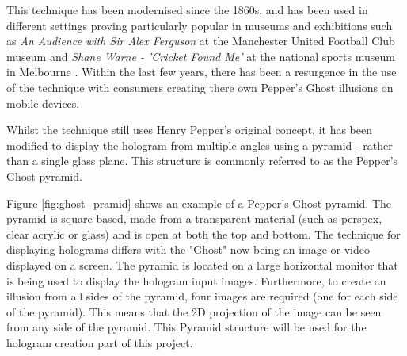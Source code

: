 This technique has been modernised since the 1860s, and has been used in different settings proving particularly popular in museums and exhibitions such as \textit{An Audience with Sir Alex Ferguson} at the Manchester United Football Club museum \cite{alex_ferguson} and \textit{Shane Warne - 'Cricket Found Me'} at the national sports museum in Melbourne \cite{shane_warne}. Within the last few years, there has been a resurgence in the use of the technique with consumers creating there own Pepper's Ghost illusions on mobile devices.

Whilst the technique still uses Henry Pepper's original concept, it has been modified to display the hologram from multiple angles using a pyramid - rather than a single glass plane. This structure is commonly referred to as the Pepper's Ghost pyramid.
\begin{figure}[h!]
\end{figure}

Figure \ref{fig:ghost_pramid} shows an example of a Pepper's Ghost pyramid. The pyramid is square based, made from a transparent material (such as perspex, clear acrylic or glass) and is open at both the top and bottom. The technique for displaying holograms differs with the "Ghost" now being an image or video displayed on a screen. The pyramid is located on a large horizontal monitor that is being used to display the hologram input images. Furthermore, to create an illusion from all sides of the pyramid, four images are required (one for each side of the pyramid). This  means that the 2D projection of the image can be seen from any side of the pyramid. This Pyramid structure will be used for the hologram creation part of this project.

